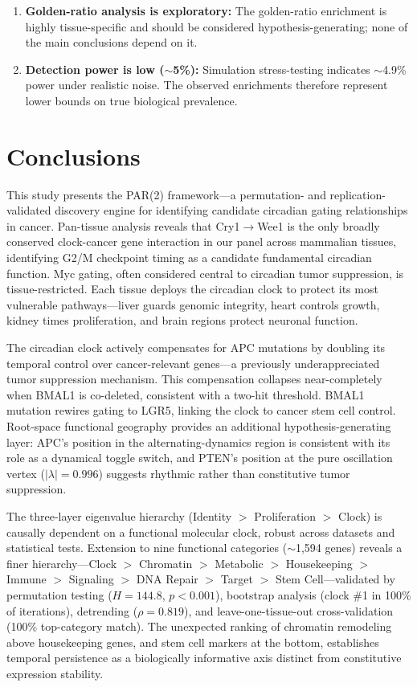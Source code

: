 \documentclass[11pt,a4paper]{article}
\begin{document}
\begin{enumerate}
    \item \textbf{Golden-ratio analysis is exploratory:} The golden-ratio enrichment is highly tissue-specific and should be considered hypothesis-generating; none of the main conclusions depend on it.
    
    \item \textbf{Detection power is low ($\sim$5\%):} Simulation stress-testing indicates $\sim$4.9\% power under realistic noise. The observed enrichments therefore represent lower bounds on true biological prevalence.
\end{enumerate}

\section{Conclusions}

This study presents the PAR(2) framework---a permutation- and replication-validated discovery engine for identifying candidate circadian gating relationships in cancer. Pan-tissue analysis reveals that Cry1$\rightarrow$Wee1 is the only broadly conserved clock-cancer gene interaction in our panel across mammalian tissues, identifying G2/M checkpoint timing as a candidate fundamental circadian function. Myc gating, often considered central to circadian tumor suppression, is tissue-restricted. Each tissue deploys the circadian clock to protect its most vulnerable pathways---liver guards genomic integrity, heart controls growth, kidney times proliferation, and brain regions protect neuronal function.

The circadian clock actively compensates for APC mutations by doubling its temporal control over cancer-relevant genes---a previously underappreciated tumor suppression mechanism. This compensation collapses near-completely when BMAL1 is co-deleted, consistent with a two-hit threshold. BMAL1 mutation rewires gating to LGR5, linking the clock to cancer stem cell control. Root-space functional geography provides an additional hypothesis-generating layer: APC's position in the alternating-dynamics region is consistent with its role as a dynamical toggle switch, and PTEN's position at the pure oscillation vertex ($|\lambda| = 0.996$) suggests rhythmic rather than constitutive tumor suppression.

The three-layer eigenvalue hierarchy (Identity $>$ Proliferation $>$ Clock) is causally dependent on a functional molecular clock, robust across datasets and statistical tests. Extension to nine functional categories ($\sim$1,594 genes) reveals a finer hierarchy---Clock $>$ Chromatin $>$ Metabolic $>$ Housekeeping $>$ Immune $>$ Signaling $>$ DNA Repair $>$ Target $>$ Stem Cell---validated by permutation testing ($H=144.8$, $p<0.001$), bootstrap analysis (clock \#1 in 100\% of iterations), detrending ($\rho = 0.819$), and leave-one-tissue-out cross-validation (100\% top-category match). The unexpected ranking of chromatin remodeling above housekeeping genes, and stem cell markers at the bottom, establishes temporal persistence as a biologically informative axis distinct from constitutive expression stability.
\end{document}
